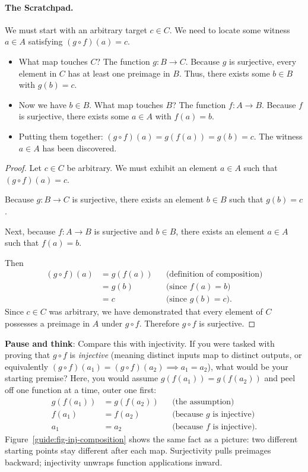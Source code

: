 \paragraph{The Scratchpad.}
We must start with an arbitrary target $c \in C$. We need to locate some witness $a \in A$ satisfying $(g \circ f)(a) = c$.
\begin{itemize}
  \item What map touches $C$? The function $g: B \to C$. Because $g$ is surjective, every element in $C$ has at least one preimage in $B$. Thus, there exists some $b \in B$ with $g(b) = c$.
  \item Now we have $b \in B$. What map touches $B$? The function $f: A \to B$. Because $f$ is surjective, there exists some $a \in A$ with $f(a) = b$.
  \item Putting them together: $(g \circ f)(a) = g(f(a)) = g(b) = c$. The witness $a \in A$ has been discovered.
\end{itemize}

\begin{proof}
Let $c \in C$ be arbitrary. We must exhibit an element $a \in A$ such that $(g \circ f)(a) = c$.

Because $g: B \to C$ is surjective, there exists an element $b \in B$ such that $g(b) = c$. 

Next, because $f: A \to B$ is surjective and $b \in B$, there exists an element $a \in A$ such that $f(a) = b$.

Then
\begin{align*}
(g \circ f)(a) &= g(f(a)) && \text{(definition of composition)}\\
&= g(b) && \text{(since $f(a) = b$)}\\
&= c && \text{(since $g(b) = c$).}
\end{align*}
Since $c \in C$ was arbitrary, we have demonstrated that every element of $C$ possesses a preimage in $A$ under $g \circ f$. Therefore $g \circ f$ is surjective.
\end{proof}

\begin{recoverybox}
\textbf{Pause and think}: Compare this with injectivity. If you were tasked with proving that $g \circ f$ is \emph{injective} (meaning distinct inputs map to distinct outputs, or equivalently $(g \circ f)(a_1) = (g \circ f)(a_2) \implies a_1 = a_2$), what would be your starting premise? Here, you would assume $g(f(a_1)) = g(f(a_2))$ and peel off one function at a time, outer one first:
\begin{align*}
g(f(a_1)) &= g(f(a_2)) && \text{(the assumption)}\\
f(a_1) &= f(a_2) && \text{(because $g$ is injective)}\\
a_1 &= a_2 && \text{(because $f$ is injective).}
\end{align*}
Figure~\ref{guide:fig-inj-composition} shows the same fact as a picture: two different starting points stay different after each map. Surjectivity pulls preimages backward; injectivity unwraps function applications inward.
\end{recoverybox}

